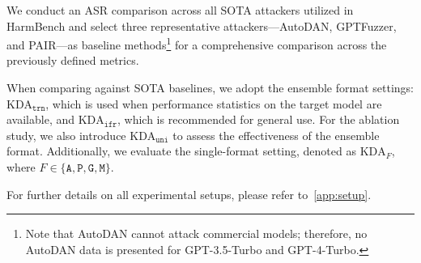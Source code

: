 
 We conduct an ASR comparison across all SOTA attackers utilized in HarmBench and select three representative attackers—AutoDAN, GPTFuzzer, and PAIR—as baseline methods\footnote{Note that AutoDAN cannot attack commercial models; therefore, no AutoDAN data is presented for GPT-3.5-Turbo and GPT-4-Turbo.} for a comprehensive comparison across the previously defined metrics.

 When comparing against SOTA baselines, we adopt the ensemble format settings: $\text{KDA}_{\texttt{trn}}$, which is used when performance statistics on the target model are available, and $\text{KDA}_{\texttt{ifr}}$, which is recommended for general use. For the ablation study, we also introduce $\text{KDA}_{\texttt{uni}}$ to assess the effectiveness of the ensemble format. Additionally, we evaluate the single-format setting, denoted as $\text{KDA}_{F}$, where $F \in \{\texttt{A}, \texttt{P}, \texttt{G}, \texttt{M}\}$.



For further details on all experimental setups, please refer to~\autoref{app:setup}. 














